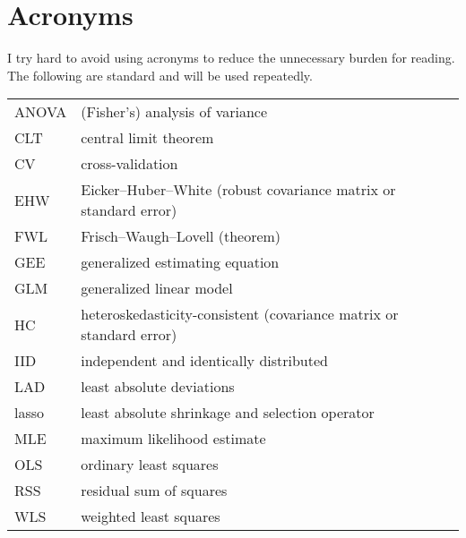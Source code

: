 \chapter*{Acronyms}


I try  hard to avoid using acronyms to reduce the unnecessary burden for reading. The following are standard and will be used repeatedly. 

\begin{tabular}{ll}
ANOVA & (Fisher's) analysis of variance \\ 
CLT & central limit theorem\\
CV& cross-validation\\ 
EHW& Eicker--Huber--White (robust covariance matrix or standard error)\\
FWL & Frisch--Waugh--Lovell (theorem)\\ 
GEE & generalized estimating equation\\ 
GLM& generalized linear model\\
HC& heteroskedasticity-consistent (covariance matrix or standard error)\\ 
IID &  independent and identically distributed\\
LAD & least absolute deviations\\ 
lasso & least absolute shrinkage and selection operator \\
MLE& maximum likelihood estimate\\ 
OLS& ordinary least squares\\
RSS& residual sum of squares\\ 
WLS& weighted least squares
\end{tabular}

